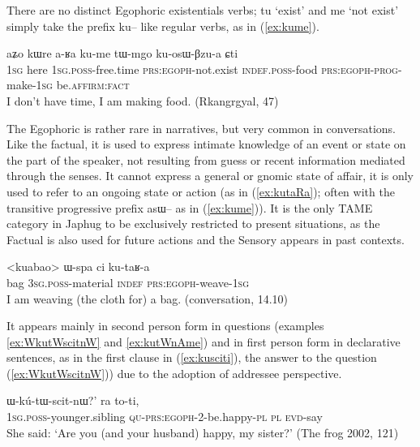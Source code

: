 \documentclass[oldfontcommands,oneside,a4paper,11pt]{article}
\newcommand{\ipa}[1]{{\phon \mbox{#1}}} %
\newcommand{\refb}[1]{(\ref{#1})}
\newcommand{\factual}[1]{\textsc{:fact}}
\begin{document}
There are no distinct Egophoric existentials verbs; \ipa{tu} `exist' and \ipa{me}  `not exist' simply take the prefix \ipa{ku--} like regular verbs, as in \refb{ex:kume}.

\begin{exe}
\ex \label{ex:kume}
\gll 
\ipa{aʑo}  	\ipa{kɯre}  	\ipa{a-ʁa}  	\ipa{ku-me}  \ipa{tɯ-mgo} 	\ipa{ku-osɯ-βzu-a} 	\ipa{ɕti} 	  	\\
\textsc{1sg} here \textsc{1sg.poss}-free.time \textsc{prs:egoph}-not.exist \textsc{indef.poss}-food \textsc{prs:egoph}-\textsc{prog}-make-\textsc{1sg} be.\textsc{affirm}\factual{}  \\
\glt I don't have time, I am making food.  (Rkangrgyal, 47)
\end{exe}

The Egophoric  is rather rare in narratives, but very common in conversations. Like the factual, it is used to express intimate knowledge of an event or state on the part of the speaker, not resulting from guess or recent information mediated through the senses. It cannot express a general or gnomic state of affair, it is only used to refer to an ongoing state or action (as in \refb{ex:kutaRa}; often with the transitive progressive prefix \ipa{asɯ--} as in \refb{ex:kume}). It is the only TAME category in Japhug to be exclusively restricted to present situations, as the Factual is also used for future actions and the Sensory appears in past contexts.

\begin{exe}
\ex \label{ex:kutaRa}
\gll 
<kuabao> 	\ipa{ɯ-spa}  	\ipa{ci}  	\ipa{ku-taʁ-a}  \\
bag \textsc{3sg.poss}-material \textsc{indef} \textsc{prs:egoph}-weave-\textsc{1sg} \\
\glt I am weaving (the cloth for) a bag. (conversation, 14.10)
\end{exe}


It appears mainly  in second person form in questions (examples \ref{ex:WkutWscitnW} and \ref{ex:kutWnAme}) and in first person form in declarative sentences, as in the first clause in \refb{ex:kusciti}, the answer to the question \refb{ex:WkutWscitnW}) due to the adoption of addressee perspective.

\begin{exe}
\ex \label{ex:WkutWscitnW}
\gll  \ipa{`a-ʁi} 			\ipa{ɯ-kú-tɯ-scit-nɯ?}' 	\ipa{ra} 	\ipa{to-ti,} \\
\textsc{1sg.poss}-younger.sibling  \textsc{qu-prs:egoph}-2-be.happy-\textsc{pl} \textsc{pl} \textsc{evd}-say \\
\glt She said: `Are you (and your husband) happy, my sister?' (The frog 2002, 121)
\end{exe}
\end{document}
